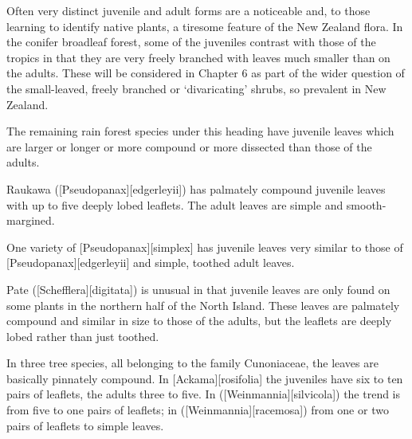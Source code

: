 Often very distinct juvenile and adult forms are a noticeable and, to those learning to identify native plants, a tiresome feature of the New Zealand flora.
In the conifer broadleaf forest, some of the juveniles contrast with those of the tropics in that they are very freely branched with leaves much smaller than on the adults.
These will be considered in Chapter 6 as part of the wider question of the small-leaved, freely branched or `divaricating' shrubs, so prevalent in New Zealand.

The remaining rain forest species under this heading have juvenile leaves which are larger or longer or more compound or more dissected than those of the adults.

Raukawa ([Pseudopanax][edgerleyii]) has palmately compound juvenile leaves with up to five deeply lobed leaflets.
The adult leaves are simple and smooth-margined.

One variety of [Pseudopanax][simplex] has juvenile leaves very similar to those of [Pseudopanax][edgerleyii] and simple, toothed adult leaves.

Pate ([Schefflera][digitata]) is unusual in that juvenile leaves are only found on some plants in the northern half of the North Island.
These leaves are palmately compound and similar in size to those of the adults, but the leaflets are deeply lobed rather than just toothed.

In three tree species, all belonging to the family Cunoniaceae, the leaves are basically pinnately compound.
In [Ackama][rosifolia] the juveniles have six to ten pairs of leaflets, the adults three to five.
In  ([Weinmannia][silvicola]) the trend is from five to one pairs of leaflets; in  ([Weinmannia][racemosa]) from one or two pairs of leaflets to simple leaves.

